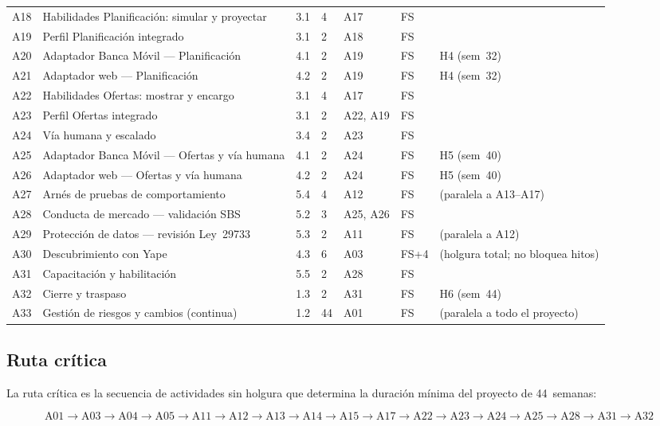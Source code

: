 \documentclass[11pt]{article}
\begin{document}
\begin{longtable}{@{}p{0.7cm} p{4.1cm} p{0.8cm} p{1.2cm} p{1.6cm} p{1.0cm} p{2.3cm}@{}}
A18 & Habilidades Planificación: simular y proyectar & 3.1 & 4 & A17 & FS & \\
A19 & Perfil Planificación integrado      & 3.1 & 2 & A18             & FS & \\
A20 & Adaptador Banca Móvil — Planificación & 4.1 & 2 & A19          & FS & H4 (sem~32) \\
A21 & Adaptador web — Planificación      & 4.2 & 2  & A19            & FS & H4 (sem~32) \\
A22 & Habilidades Ofertas: mostrar y encargo & 3.1 & 4 & A17         & FS & \\
A23 & Perfil Ofertas integrado            & 3.1 & 2 & A22, A19        & FS & \\
A24 & Vía humana y escalado              & 3.4 & 2  & A23            & FS & \\
A25 & Adaptador Banca Móvil — Ofertas y vía humana & 4.1 & 2 & A24  & FS & H5 (sem~40) \\
A26 & Adaptador web — Ofertas y vía humana & 4.2 & 2 & A24           & FS & H5 (sem~40) \\
A27 & Arnés de pruebas de comportamiento & 5.4 & 4  & A12            & FS & (paralela a A13–A17) \\
A28 & Conducta de mercado — validación SBS & 5.2 & 3 & A25, A26      & FS & \\
A29 & Protección de datos — revisión Ley~29733 & 5.3 & 2 & A11      & FS & (paralela a A12) \\
A30 & Descubrimiento con Yape            & 4.3 & 6  & A03            & FS+4 & (holgura total; no bloquea hitos) \\
A31 & Capacitación y habilitación        & 5.5 & 2  & A28            & FS & \\
A32 & Cierre y traspaso                  & 1.3 & 2  & A31            & FS & H6 (sem~44) \\
A33 & Gestión de riesgos y cambios (continua) & 1.2 & 44 & A01      & FS & (paralela a todo el proyecto) \\
\end{longtable}

\subsection{Ruta crítica}

La ruta crítica es la secuencia de actividades sin holgura que determina la duración mínima del proyecto de 44~semanas:

\[
\text{A01} \!\to\! \text{A03} \!\to\! \text{A04} \!\to\! \text{A05} \!\to\! \text{A11} \!\to\! \text{A12} \!\to\! \text{A13} \!\to\! \text{A14} \!\to\! \text{A15} \!\to\! \text{A17} \!\to\! \text{A22} \!\to\! \text{A23} \!\to\! \text{A24} \!\to\! \text{A25} \!\to\! \text{A28} \!\to\! \text{A31} \!\to\! \text{A32}
\]
\end{document}
